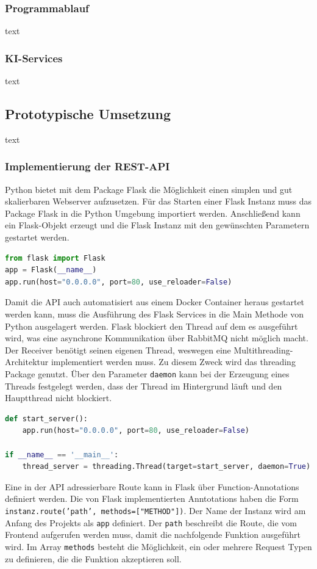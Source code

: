 \subsubsection{Programmablauf}
text
\subsubsection{KI-Services}
text 
\subsection{Prototypische Umsetzung}
text
\subsubsection{Implementierung der REST-API}
Python bietet mit dem Package Flask die Möglichkeit einen simplen und gut skalierbaren Webserver aufzusetzen. Für das Starten einer Flask Instanz muss das Package Flask in die Python Umgebung importiert werden. Anschließend kann ein Flask-Objekt erzeugt und die Flask Instanz mit den gewünschten Parametern gestartet werden.

\begin{lstlisting}[language=Python]
from flask import Flask
app = Flask(__name__)
app.run(host="0.0.0.0", port=80, use_reloader=False)
\end{lstlisting}

Damit die API auch automatisiert aus einem Docker Container heraus gestartet werden kann, muss die Ausführung des Flask Services in die Main Methode von Python ausgelagert werden. Flask blockiert den Thread auf dem es ausgeführt wird, was eine asynchrone Kommunikation über RabbitMQ nicht möglich macht. Der Receiver benötigt seinen eigenen Thread, weswegen eine Multithreading-Architektur implementiert werden muss. Zu diesem Zweck wird das threading Package genutzt. Über den Parameter \texttt{daemon} kann bei der Erzeugung eines Threads festgelegt werden, dass der Thread im Hintergrund läuft und den Hauptthread nicht blockiert.

\begin{lstlisting}[language=Python]
def start_server():
    app.run(host="0.0.0.0", port=80, use_reloader=False)

if __name__ == '__main__':
    thread_server = threading.Thread(target=start_server, daemon=True).start()
\end{lstlisting}

Eine in der API adressierbare Route kann in Flask über Function-Annotations definiert werden. Die von Flask implementierten Anntotations haben die Form \texttt{instanz.route('path', methods=["METHOD"])}. Der Name der Instanz wird am Anfang des Projekts als \texttt{app} definiert. Der \texttt{path} beschreibt die Route, die vom Frontend aufgerufen werden muss, damit die nachfolgende Funktion ausgeführt wird. Im Array \texttt{methods} besteht die Möglichkeit, ein oder mehrere Request Typen zu definieren, die die Funktion akzeptieren soll.

